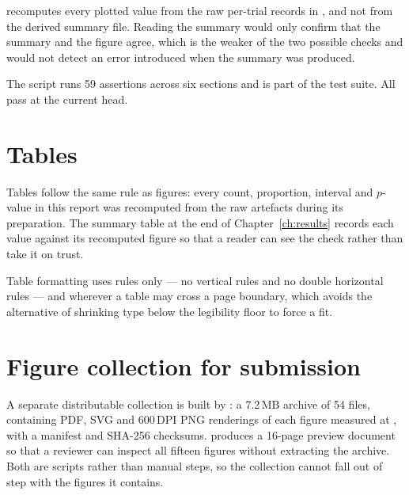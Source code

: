  recomputes every plotted value from the raw per-trial
records in , and not from the
derived summary file. Reading the summary would only confirm that the summary and the figure
agree, which is the weaker of the two possible checks and would not detect an error introduced
when the summary was produced.

The script runs 59 assertions across six sections and is part of the test suite. All pass at the
current head.

\section{Tables}

Tables follow the same rule as figures: every count, proportion, interval and $p$-value in this
report was recomputed from the raw artefacts during its preparation. The summary table at the end
of Chapter~\ref{ch:results} records each value against its recomputed figure so that a reader can
see the check rather than take it on trust.

Table formatting uses  rules only --- no vertical rules and no double horizontal
rules --- and  wherever a table may cross a page boundary, which avoids the
alternative of shrinking type below the legibility floor to force a fit.

\section{Figure collection for submission}

A separate distributable collection is built by : a
7.2\,MB archive of 54 files, containing PDF, SVG and 600\,DPI PNG renderings of each figure
measured at , with a manifest and SHA-256 checksums.
 produces a 16-page preview document so that a reviewer can
inspect all fifteen figures without extracting the archive. Both are scripts rather than manual
steps, so the collection cannot fall out of step with the figures it contains.
